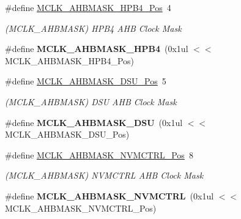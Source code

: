 \begin{DoxyCompactItemize}
\item 
\hypertarget{group___s_a_m_l21___m_c_l_k_gab9b11305713c203d9dfee2cbcb51feb9}{}\#define \hyperlink{group___s_a_m_l21___m_c_l_k_gab9b11305713c203d9dfee2cbcb51feb9}{M\+C\+L\+K\+\_\+\+A\+H\+B\+M\+A\+S\+K\+\_\+\+H\+P\+B4\+\_\+\+Pos}~4\label{group___s_a_m_l21___m_c_l_k_gab9b11305713c203d9dfee2cbcb51feb9}

\begin{DoxyCompactList}\small\item\em (M\+C\+L\+K\+\_\+\+A\+H\+B\+M\+A\+S\+K) H\+P\+B4 A\+H\+B Clock Mask \end{DoxyCompactList}\item 
\hypertarget{group___s_a_m_l21___m_c_l_k_ga684a9680af528e496524af474154a138}{}\#define {\bfseries M\+C\+L\+K\+\_\+\+A\+H\+B\+M\+A\+S\+K\+\_\+\+H\+P\+B4}~(0x1ul $<$$<$ M\+C\+L\+K\+\_\+\+A\+H\+B\+M\+A\+S\+K\+\_\+\+H\+P\+B4\+\_\+\+Pos)\label{group___s_a_m_l21___m_c_l_k_ga684a9680af528e496524af474154a138}

\item 
\hypertarget{group___s_a_m_l21___m_c_l_k_gaf25c239a7914145d262614e4cea537b3}{}\#define \hyperlink{group___s_a_m_l21___m_c_l_k_gaf25c239a7914145d262614e4cea537b3}{M\+C\+L\+K\+\_\+\+A\+H\+B\+M\+A\+S\+K\+\_\+\+D\+S\+U\+\_\+\+Pos}~5\label{group___s_a_m_l21___m_c_l_k_gaf25c239a7914145d262614e4cea537b3}

\begin{DoxyCompactList}\small\item\em (M\+C\+L\+K\+\_\+\+A\+H\+B\+M\+A\+S\+K) D\+S\+U A\+H\+B Clock Mask \end{DoxyCompactList}\item 
\hypertarget{group___s_a_m_l21___m_c_l_k_ga65924af4e0fa2107ba83b9a2e6f58049}{}\#define {\bfseries M\+C\+L\+K\+\_\+\+A\+H\+B\+M\+A\+S\+K\+\_\+\+D\+S\+U}~(0x1ul $<$$<$ M\+C\+L\+K\+\_\+\+A\+H\+B\+M\+A\+S\+K\+\_\+\+D\+S\+U\+\_\+\+Pos)\label{group___s_a_m_l21___m_c_l_k_ga65924af4e0fa2107ba83b9a2e6f58049}

\item 
\hypertarget{group___s_a_m_l21___m_c_l_k_ga81becb828c915d5aac7686148213cb7a}{}\#define \hyperlink{group___s_a_m_l21___m_c_l_k_ga81becb828c915d5aac7686148213cb7a}{M\+C\+L\+K\+\_\+\+A\+H\+B\+M\+A\+S\+K\+\_\+\+N\+V\+M\+C\+T\+R\+L\+\_\+\+Pos}~8\label{group___s_a_m_l21___m_c_l_k_ga81becb828c915d5aac7686148213cb7a}

\begin{DoxyCompactList}\small\item\em (M\+C\+L\+K\+\_\+\+A\+H\+B\+M\+A\+S\+K) N\+V\+M\+C\+T\+R\+L A\+H\+B Clock Mask \end{DoxyCompactList}\item 
\hypertarget{group___s_a_m_l21___m_c_l_k_ga59eafea8fd7c2b1338f9d8c459dc9e1e}{}\#define {\bfseries M\+C\+L\+K\+\_\+\+A\+H\+B\+M\+A\+S\+K\+\_\+\+N\+V\+M\+C\+T\+R\+L}~(0x1ul $<$$<$ M\+C\+L\+K\+\_\+\+A\+H\+B\+M\+A\+S\+K\+\_\+\+N\+V\+M\+C\+T\+R\+L\+\_\+\+Pos)\label{group___s_a_m_l21___m_c_l_k_ga59eafea8fd7c2b1338f9d8c459dc9e1e}


\end{DoxyCompactItemize}
